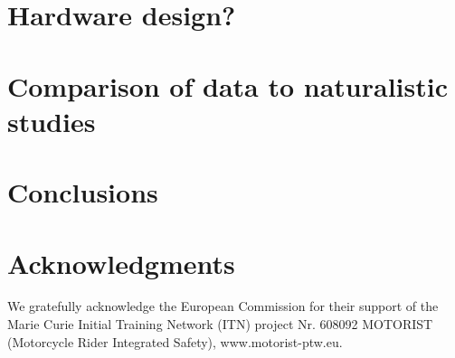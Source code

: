 \documentclass[11pt,a4paper,reqno]{amsart}
\begin{document}
\section{Hardware design?}

\section{Comparison of data to naturalistic studies}

\section{Conclusions}

\section{Acknowledgments}
We gratefully acknowledge the European Commission for their support of the Marie Curie Initial Training Network (ITN)
project Nr. 608092 MOTORIST (Motorcycle Rider Integrated Safety), www.motorist-ptw.eu.



\end{document}
